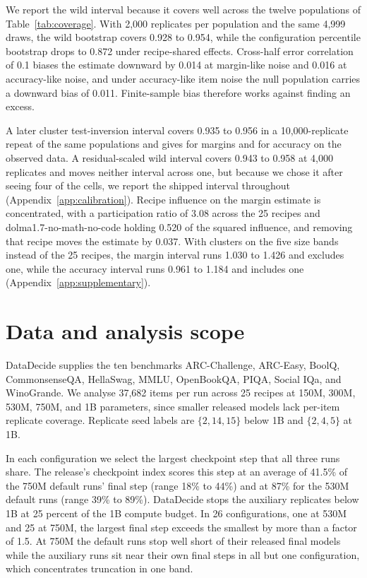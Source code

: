 We report the wild interval because it covers well across the twelve populations of Table~\ref{tab:coverage}. With 2,000 replicates per population and the same 4,999 draws, the wild bootstrap covers 0.928 to 0.954, while the configuration percentile bootstrap drops to 0.872 under recipe-shared effects. Cross-half error correlation of 0.1 biases the estimate downward by 0.014 at margin-like noise and 0.016 at accuracy-like noise, and under accuracy-like item noise the null population carries a downward bias of 0.011. Finite-sample bias therefore works against finding an excess.

A later cluster test-inversion interval covers 0.935 to 0.956 in a 10,000-replicate repeat of the same populations and gives  for margins and  for accuracy on the observed data. A residual-scaled wild interval covers 0.943 to 0.958 at 4,000 replicates and moves neither interval across one, but because we chose it after seeing four of the cells, we report the shipped interval throughout (Appendix~\ref{app:calibration}). Recipe influence on the margin estimate is concentrated, with a participation ratio of 3.08 across the 25 recipes and dolma1.7-no-math-no-code holding 0.520 of the squared influence, and removing that recipe moves the estimate by 0.037. With clusters on the five size bands instead of the 25 recipes, the margin interval runs 1.030 to 1.426 and excludes one, while the accuracy interval runs 0.961 to 1.184 and includes one (Appendix~\ref{app:supplementary}).

\section{Data and analysis scope}
\label{sec:data}
DataDecide supplies the ten benchmarks ARC-Challenge, ARC-Easy, BoolQ, CommonsenseQA, HellaSwag, MMLU, OpenBookQA, PIQA, Social IQa, and WinoGrande. We analyse 37,682 items per run across 25 recipes at 150M, 300M, 530M, 750M, and 1B parameters, since smaller released models lack per-item replicate coverage. Replicate seed labels are $\{2,14,15\}$ below 1B and $\{2,4,5\}$ at 1B.

In each configuration we select the largest checkpoint step that all three runs share. The release's checkpoint index scores this step at an average of 41.5\% of the 750M default runs' final step (range 18\% to 44\%) and at 87\% for the 530M default runs (range 39\% to 89\%). DataDecide stops the auxiliary replicates below 1B at 25 percent of the 1B compute budget. In 26 configurations, one at 530M and 25 at 750M, the largest final step exceeds the smallest by more than a factor of 1.5. At 750M the default runs stop well short of their released final models while the auxiliary runs sit near their own final steps in all but one configuration, which concentrates truncation in one band.

